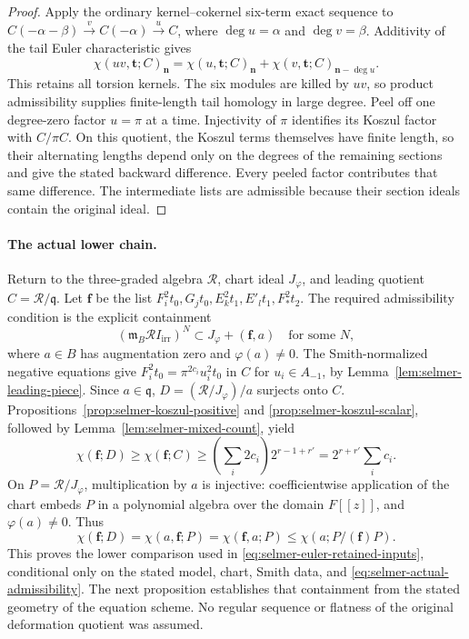 \begin{proof}
Apply the ordinary kernel--cokernel six-term exact sequence to
$C(-\alpha-\beta)\xrightarrow{v}C(-\alpha)\xrightarrow{u}C$,
where $\deg u=\alpha$ and $\deg v=\beta$. Additivity of the tail Euler
characteristic gives
\[
 \chi(uv,\boldsymbol t;C)_{\boldsymbol n}
 =\chi(u,\boldsymbol t;C)_{\boldsymbol n}
  +\chi(v,\boldsymbol t;C)_{\boldsymbol n-\deg u}.
\]
This retains all torsion kernels. The six modules are killed by $uv$,
so product admissibility supplies finite-length tail homology in large
degree. Peel off one degree-zero factor $u=\pi$ at a time.
Injectivity of $\pi$ identifies its Koszul factor with $C/\pi C$.
On this quotient, the Koszul terms themselves have finite length, so their
alternating lengths depend only on the degrees of the remaining sections
and give the stated backward difference. Every peeled factor contributes
that same difference. The intermediate lists are admissible because their
section ideals contain the original ideal.
\end{proof}

\paragraph{The actual lower chain.}
Return to the three-graded algebra $\mathcal R$, chart ideal $J_\varphi$,
and leading quotient $C=\mathcal R/\mathfrak q$. Let $\boldsymbol f$
be the list $F_i^2t_0,G_jt_0,E_k^2t_1,E'_lt_1,F_*^2t_2$.
The required admissibility condition is the explicit containment
\begin{equation}
 (\mathfrak m_B\mathcal R I_{\mathrm{irr}})^N
 \subset J_\varphi+(\boldsymbol f,a)
 \quad\text{for some }N,
 \label{eq:selmer-actual-admissibility}
\end{equation}
where $a\in B$ has augmentation zero and $\varphi(a)\ne0$.
The Smith-normalized negative equations give
$F_i^2t_0=\pi^{2c_i}u_i^2t_0$ in $C$ for $u_i\in A_{-1}$, by
Lemma~\ref{lem:selmer-leading-piece}. Since $a\in\mathfrak q$,
$D=(\mathcal R/J_\varphi)/a$ surjects onto $C$.
Propositions~\ref{prop:selmer-koszul-positive} and
\ref{prop:selmer-koszul-scalar}, followed by
Lemma~\ref{lem:selmer-mixed-count}, yield
\[
 \chi(\boldsymbol f;D)
 \ge\chi(\boldsymbol f;C)
 \ge\left(\sum_i2c_i\right)2^{r-1+r'}
 =2^{r+r'}\sum_i c_i.
\]
On $P=\mathcal R/J_\varphi$, multiplication by $a$ is injective:
coefficientwise application of the chart embeds $P$ in a polynomial
algebra over the domain $F[[z]]$, and $\varphi(a)\ne0$. Thus
\[
 \chi(\boldsymbol f;D)
 =\chi(a,\boldsymbol f;P)
 =\chi(\boldsymbol f,a;P)
 \le\chi(a;P/(\boldsymbol f)P).
\]
This proves the lower comparison used in
\eqref{eq:selmer-euler-retained-inputs}, conditional only on the stated
model, chart, Smith data, and
\eqref{eq:selmer-actual-admissibility}. The next proposition establishes
that containment from the stated geometry of the equation scheme. No regular sequence
or flatness of the original deformation quotient was assumed.
